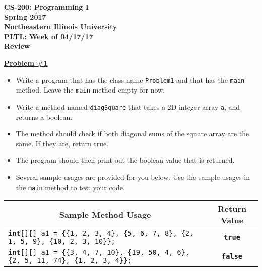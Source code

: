 \documentclass[12pt]{article}
\begin{document}
\begin{center}
	\textbf{CS-200: Programming I}\\
	\textbf{Spring 2017}\\
	\textbf{Northeastern Illinois University}\\
	\textbf{PLTL: Week of 04/17/17}\\
	\textbf{Review}
\end{center}


\noindent\underline{\textbf{Problem \#1}}
\begin{itemize}
	\item Write a program that has the class name \texttt{Problem1} and that has the \texttt{main} method. Leave the \texttt{main} method empty for now.
	\item Write a method named \texttt{diagSquare} that takes a 2D integer array \texttt{a}, and returns a boolean.
	\item The method should check if both diagonal sums of the square array are the same. If they are, return true.
	\item The program should then print out the boolean value that is returned.
	\item Several sample usages are provided for you below. Use the sample usages in the \texttt{main} method to test your code.
\end{itemize}

\begin{table}[htbp]
  \centering
    \begin{tabular}{|p{26.66em}|c|}
    \toprule
    \multicolumn{1}{|c|}{Sample Method Usage} & Return Value \\
    \midrule
    \texttt{\textbf{int}[][] a1 = \{\{1, 2, 3,  4\},\newline \hspace*{2.85cm} \{5, 6, 7, 8\},\newline \hspace*{2.85cm} \{2, 1, 5, 9\}, \newline \hspace*{2.85cm} \{10, 2, 3, 10\}\}; }& \texttt{\textbf{true}} \\
    \midrule
    \texttt{\textbf{int}[][] a1 = \{\{3, 4, 7,  10\},\newline \hspace*{2.85cm} \{19, 50, 4, 6\},\newline \hspace*{2.85cm} \{2, 5, 11, 74\},\newline \hspace*{2.85cm} \{1, 2, 3, 4\}\}; } & \texttt{\textbf{false}} \\
    \bottomrule
    \end{tabular}%
  \label{tab:addlabel}%
\end{table}%
\end{document}
